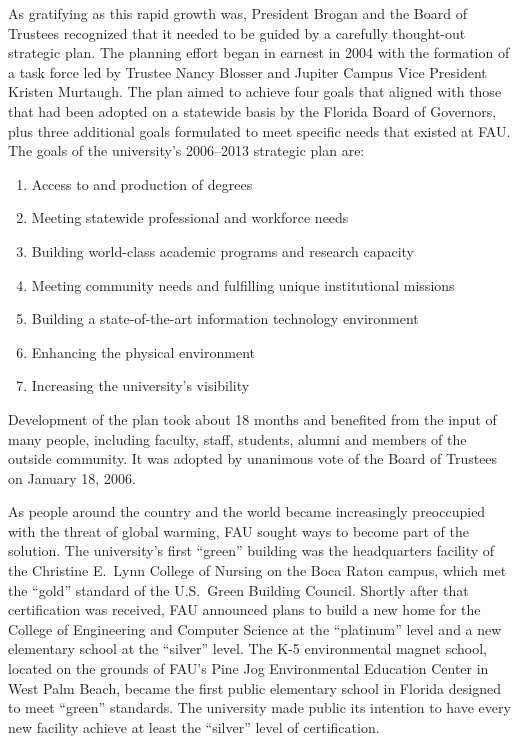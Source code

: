 \documentclass{article}
\begin{document}
As gratifying as this rapid growth was, President Brogan and the Board of Trustees recognized that it needed to be guided by a carefully thought-out strategic plan. The planning effort began in earnest in 2004 with the formation of a task force led by Trustee Nancy Blosser and Jupiter Campus Vice President Kristen Murtaugh.  The plan aimed to achieve four goals that aligned with those that had been adopted on a statewide basis by the Florida Board of Governors, plus three additional goals formulated to meet specific needs that existed at FAU.  The goals of the university's 2006--2013 strategic plan are:
%
\begin{enumerate}
\item Access to and production of degrees
\item Meeting statewide professional and workforce needs
\item Building world-class academic programs and research capacity
\item Meeting community needs and fulfilling unique institutional missions
\item Building a state-of-the-art information technology environment
\item Enhancing the physical environment
\item Increasing the university's visibility
\end{enumerate}
%
Development of the plan took about 18 months and benefited from the input of many people, including faculty, staff, students, alumni and members of the outside community.  It was adopted by unanimous vote of the Board of Trustees on January 18, 2006.

As people around the country and the world became increasingly preoccupied with the threat of global warming, FAU sought ways to become part of the solution. The university's first ``green'' building was the headquarters facility of the Christine E.\ Lynn College of Nursing on the Boca Raton campus, which met the ``gold'' standard of the U.S.\ Green Building Council.  Shortly after that certification was received, FAU announced plans to build a new home for the College of Engineering and Computer Science at the ``platinum'' level and a new elementary school at the ``silver'' level.  The K-5 environmental magnet school, located on the grounds of FAU's Pine Jog Environmental Education Center in West Palm Beach, became the first public elementary school in Florida designed to meet ``green'' standards.  The university made public its intention to have every new facility achieve at least the ``silver'' level of certification.
\end{document}
